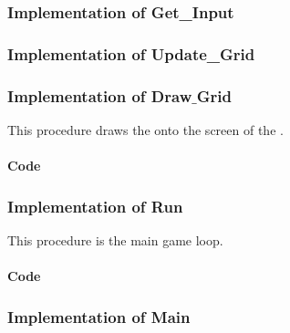 \subsubsection{Implementation of Get\_Input}


\subsubsection{Implementation of Update\_Grid}


\subsubsection{Implementation of Draw$\_$Grid}

This procedure draws the \grid onto the screen of the \stmdb.

\paragraph{Code}
\noindent
\begin{centering}

\end{centering}

\newpage

\subsubsection{Implementation of Run}

This procedure is the main game loop.

\paragraph{Code}
\begin{centering}

\end{centering}

\subsubsection{Implementation of Main}


\newpage
